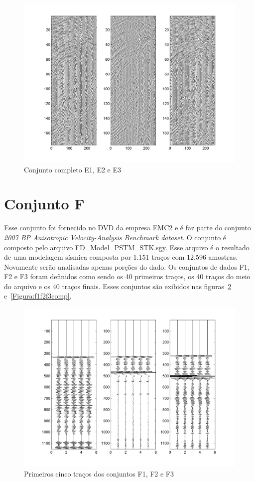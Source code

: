 \begin{figure}[!h]
\centering
\includegraphics[scale=1.01]{fig/fig_E2.png}
\caption{Conjunto completo E1, E2 e E3}
\label{Figura:e1e2e3comp}
\end{figure}

\section{Conjunto F}

Esse conjunto foi fornecido no DVD da empresa EMC2 e é faz parte do conjunto 
\emph{2007 BP Anisotropic Velocity-Analysis Benchmark dataset}. O conjunto é
composto pelo arquivo FD\_Model\_PSTM\_STK.sgy. Esse arquivo
é o resultado de uma modelagem sísmica composta por 1.151 traços com 12.596
amostras. Novamente serão analisadas apenas
porções do dado. Os conjuntos de dados F1, F2 e F3 foram definidos como sendo os
40 primeiros traços, os 40 traços do  meio do arquivo e os 40 traços finais.
Esses conjuntos são exibidos nas figuras~\ref{Figura:f1f2f3}
e~\ref{Figura:f1f2f3comp}.

\begin{figure}[!h]
\centering
  \includegraphics[scale=1.01]{fig/fig_F1.png}
  \caption{Primeiros cinco traços dos conjuntos F1, F2 e F3}
  \label{Figura:f1f2f3}
\end{figure}

